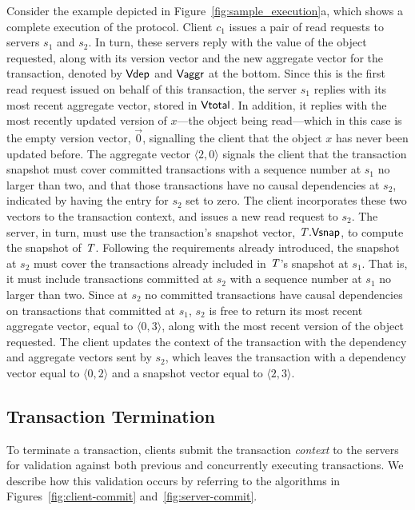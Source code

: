 Consider the example depicted in Figure~\ref{fig:sample_execution}a, which shows a complete execution of the protocol. Client $c_1$ issues a pair of read requests to servers $s_1$ and $s_2$. In turn, these servers reply with the value of the object requested, along with its version vector and the new aggregate vector for the transaction, denoted by $\mathsf{Vdep}$ and $\mathsf{Vaggr}$ at the bottom. Since this is the first read request issued on behalf of this transaction, the server $s_1$ replies with its most recent aggregate vector, stored in $\mathsf{Vtotal}$. In addition, it replies with the most recently updated version of $x$---the object being read---which in this case is the empty version vector, $\vec{0}$, signalling the client that the object $x$ has never been updated before. The aggregate vector $\langle 2, 0 \rangle$ signals the client that the transaction snapshot must cover committed transactions with a sequence number at $s_1$ no larger than two, and that those transactions have no causal dependencies at $s_2$, indicated by having the entry for $s_2$ set to zero. The client incorporates these two vectors to the transaction context, and issues a new read request to $s_2$. The server, in turn, must use the transaction's snapshot vector, $\mathit{T}.\mathsf{Vsnap}$, to compute the snapshot of $\mathit{T}$. Following the requirements already introduced, the snapshot at $s_2$ must cover the transactions already included in $\mathit{T}$'s snapshot at $s_1$. That is, it must include transactions committed at $s_2$ with a sequence number at $s_1$ no larger than two. Since at $s_2$ no committed transactions have causal dependencies on transactions that committed at $s_1$, $s_2$ is free to return its most recent aggregate vector, equal to $\langle 0, 3 \rangle$, along with the most recent version of the object requested. The client updates the context of the transaction with the dependency and aggregate vectors sent by $s_2$, which leaves the transaction with a dependency vector equal to $\langle 0, 2 \rangle$ and a snapshot vector equal to $\langle 2, 3 \rangle$.

\subsection{Transaction Termination}

To terminate a transaction, clients submit the transaction \emph{context} to the servers for validation against both previous and concurrently executing transactions. We describe how this validation occurs by referring to the algorithms in Figures~\ref{fig:client-commit} and~\ref{fig:server-commit}.

